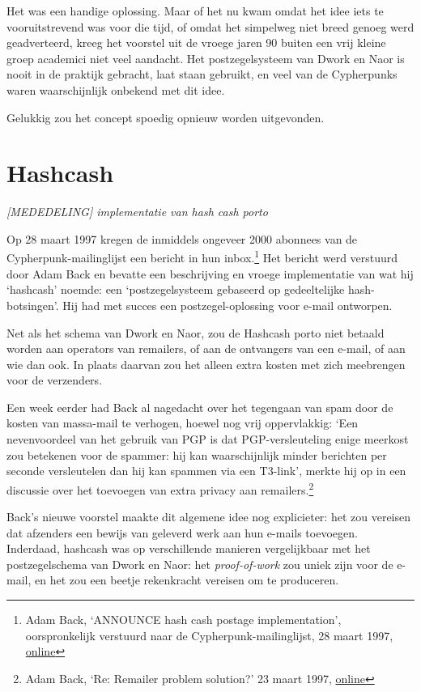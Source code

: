 \documentclass[
  a5paper,
  smalldemyvopaper,11pt,twoside,onecolumn,openright,extrafontsizes]{memoir}
\begin{document}
Het was een handige oplossing. Maar of het nu kwam omdat het idee iets
te vooruitstrevend was voor die tijd, of omdat het simpelweg niet breed
genoeg werd geadverteerd, kreeg het voorstel uit de vroege jaren 90
buiten een vrij kleine groep academici niet veel aandacht. Het
postzegelsysteem van Dwork en Naor is nooit in de praktijk gebracht,
laat staan gebruikt, en veel van de Cypherpunks waren waarschijnlijk
onbekend met dit idee.

Gelukkig zou het concept spoedig opnieuw worden uitgevonden.

\section{Hashcash}\label{hashcash-1}

\emph{{[}MEDEDELING{]} implementatie van hash cash porto}

Op 28 maart 1997 kregen de inmiddels ongeveer 2000 abonnees van de
Cypherpunk-mailinglijst een bericht in hun inbox.\footnote{Adam Back,
  `ANNOUNCE hash cash postage implementation', oorspronkelijk verstuurd
  naar de Cypherpunk-mailinglijst, 28 maart 1997,
  \href{https://cypherpunks.venona.com/date/1997/03/msg00774.html}{online}}
Het bericht werd verstuurd door Adam Back en bevatte een beschrijving en
vroege implementatie van wat hij `hashcash' noemde: een
`postzegelsysteem gebaseerd op gedeeltelijke hash-botsingen'. Hij had
met succes een postzegel-oplossing voor e-mail ontworpen.

Net als het schema van Dwork en Naor, zou de Hashcash porto niet betaald
worden aan operators van remailers, of aan de ontvangers van een e-mail,
of aan wie dan ook. In plaats daarvan zou het alleen extra kosten met
zich meebrengen voor de verzenders.

Een week eerder had Back al nagedacht over het tegengaan van spam door
de kosten van massa-mail te verhogen, hoewel nog vrij oppervlakkig: `Een
nevenvoordeel van het gebruik van PGP is dat PGP-versleuteling enige
meerkost zou betekenen voor de spammer: hij kan waarschijnlijk minder
berichten per seconde versleutelen dan hij kan spammen via een T3-link',
merkte hij op in een discussie over het toevoegen van extra privacy aan
remailers.\footnote{Adam Back, `Re: Remailer problem solution?' 23 maart
  1997,
  \href{https://cypherpunks.venona.com/date/1997/03/msg00631.html}{online}}

Back's nieuwe voorstel maakte dit algemene idee nog explicieter: het zou
vereisen dat afzenders een bewijs van geleverd werk aan hun e-mails
toevoegen. Inderdaad, hashcash was op verschillende manieren
vergelijkbaar met het postzegelschema van Dwork en Naor: het
\emph{proof-of-work} zou uniek zijn voor de e-mail, en het zou een
beetje rekenkracht vereisen om te produceren.
\end{document}
